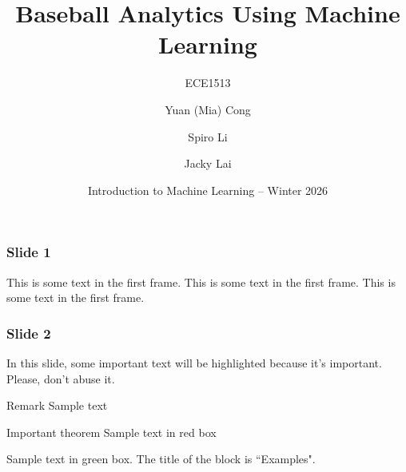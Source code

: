 \documentclass{beamer}
\title[Baseball Analytics Using Machine Learning]
{Baseball Analytics Using Machine Learning}
\subtitle{ECE1513}
\author[Mia Cong, Spiro Li, Jacky Lai] 
{Yuan (Mia) Cong\inst{1} \and Spiro Li\inst{2} \and Jacky Lai\inst{3}}
\institute[ ] %
{
  \inst{1}%
  Department of Mechanical \& Industrial Engineering
  \and
  \inst{2}%
  Department of Electrical and Computer Engineering
  \and
   \inst{3}%
  Department of Mechanical \& Industrial Engineering
}
\date[IntroML] %
{Introduction to Machine Learning -- Winter 2026}
\begin{document}
\frame{\titlepage}


\begin{frame}
\frametitle{Slide 1}
This is some text in the first frame. This is some text in the first frame. This is some text in the first frame.
\end{frame}


\begin{frame}
\frametitle{Slide 2}

In this slide, some important text will be
\alert{highlighted} because it's important.
Please, don't abuse it.

\begin{block}{Remark}
Sample text
\end{block}

\begin{alertblock}{Important theorem}
Sample text in red box
\end{alertblock}

\begin{examples}
Sample text in green box. The title of the block is ``Examples".
\end{examples}
\end{frame}
\end{document}
